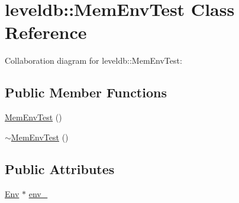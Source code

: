 \hypertarget{classleveldb_1_1_mem_env_test}{\section{leveldb\-:\-:Mem\-Env\-Test Class Reference}
\label{classleveldb_1_1_mem_env_test}
}


Collaboration diagram for leveldb\-:\-:Mem\-Env\-Test\-:
\subsection*{Public Member Functions}
\begin{DoxyCompactItemize}
\item 
\hyperlink{classleveldb_1_1_mem_env_test_aac01276f9420d25ffa3b809b7c4ec99d}{Mem\-Env\-Test} ()
\item 
\hyperlink{classleveldb_1_1_mem_env_test_a46676b96154c7661452bee84452718d3}{$\sim$\-Mem\-Env\-Test} ()
\end{DoxyCompactItemize}
\subsection*{Public Attributes}
\begin{DoxyCompactItemize}
\item 
\hyperlink{classleveldb_1_1_env}{Env} $\ast$ \hyperlink{classleveldb_1_1_mem_env_test_a76f81d9090cc4c3cce4a81d8af745359}{env\-\_\-}
\end{DoxyCompactItemize}


